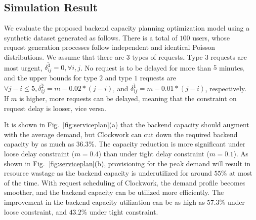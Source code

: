 \subsection{Simulation Result}
We evaluate the proposed backend capacity planning optimization model using a synthetic dataset generated as follows. There is a total of $100$ users, whose request generation processes follow independent and identical Poisson distributions.  We assume that there are $3$ types of requests. Type $3$ requests are most urgent, $\overline{\delta_{ij}^3}=0, \forall i,j$. No request is to be delayed for more than $5$ minutes, and the upper bounds for type $2$ and type $1$ requests are $\forall j-i\le 5, \overline{\delta_{ij}^2} =m-0.02*(j-i)$, and $\overline{\delta_{ij}^1} =m-0.01*(j-i)$, respectively. If $m$ is higher, more requests can be delayed, meaning that the constraint on request delay is looser, vice versa.

 It is shown in Fig.~\ref{fig:serviceplan}(a) that the backend capacity should augment with the average demand, but Clockwork can cut down the required backend capacity by as much as $36.3\%$. The capacity reduction is more significant under loose delay constraint ($m=0.4$) than under tight delay constraint ($m=0.1$). As shown in Fig.~\ref{fig:serviceplan}(b), provisioning for the peak demand will result in resource wastage as the backend capacity is underutilized for around $55\%$ at most of the time. With request scheduling of Clockwork, the demand profile becomes smoother, and the backend capacity can be utilized more efficiently. The improvement in the backend capacity utilization can be as high as $57.3\%$ under loose constraint, and $43.2\%$ under tight constraint.
 



